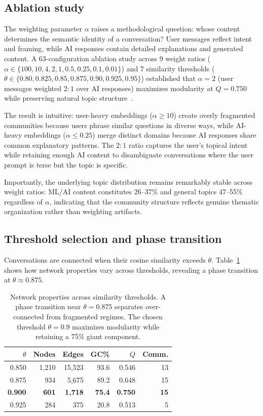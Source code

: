 \documentclass[journal]{IEEEtran}
\begin{document}
\subsection{Ablation study}

The weighting parameter $\alpha$ raises a methodological question:
whose content determines the semantic identity of a conversation?  User
messages reflect intent and framing, while AI responses contain detailed
explanations and generated content.  A 63-configuration ablation study
across 9 weight ratios
($\alpha \in \{100, 10, 4, 2, 1, 0.5, 0.25, 0.1, 0.01\}$) and 7
similarity thresholds
($\theta \in \{0.80, 0.825, 0.85, 0.875, 0.90, 0.925, 0.95\}$)
established that $\alpha = 2$ (user messages weighted $2{:}1$ over AI
responses) maximizes modularity at $Q = 0.750$ while preserving natural
topic structure~\cite{towell2025cognitive}.

The result is intuitive: user-heavy embeddings ($\alpha \geq 10$)
create overly fragmented communities because users phrase similar
questions in diverse ways, while AI-heavy embeddings ($\alpha \leq 0.25$)
merge distinct domains because AI responses share common explanatory
patterns.  The $2{:}1$ ratio captures the user's topical intent while
retaining enough AI content to disambiguate conversations where the user
prompt is terse but the topic is specific.

Importantly, the underlying topic distribution remains remarkably stable
across weight ratios: ML/AI content constitutes 26--37\% and general
topics 47--55\% regardless of $\alpha$, indicating that the community
structure reflects genuine thematic organization rather than weighting
artifacts.

\subsection{Threshold selection and phase transition}

Conversations are connected when their cosine similarity exceeds
$\theta$.  Table~\ref{tab:threshold} shows how network properties vary
across thresholds, revealing a phase transition at
$\theta \approx 0.875$.

\begin{table}[t]
  \centering
  \caption{Network properties across similarity thresholds.  A phase
    transition near $\theta = 0.875$ separates over-connected from
    fragmented regimes.  The chosen threshold $\theta = 0.9$ maximizes
    modularity while retaining a 75\% giant component.}
  \label{tab:threshold}
  \small
  \begin{tabular}{@{}rrrrrr@{}}
    \toprule
    $\theta$ & Nodes & Edges & GC\% & $Q$ & Comm. \\
    \midrule
    0.850 & 1,210 & 15,523 & 93.6 & 0.546 & 13 \\
    0.875 & 934 & 5,675 & 89.2 & 0.648 & 15 \\
    \textbf{0.900} & \textbf{601} & \textbf{1,718} & \textbf{75.4} &
      \textbf{0.750} & \textbf{15} \\
    0.925 & 284 & 375 & 20.8 & 0.513 & 5 \\
    \bottomrule
  \end{tabular}
\end{table}
\end{document}

